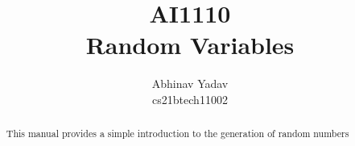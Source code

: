 \documentclass[journal,12pt,twocolumn]{IEEEtran}
\renewcommand\thesection{\arabic{section}}
\begin{document}
\let\StandardTheFigure\thefigure
\renewcommand{\thefigure}{\thesection}



\makeatletter
{}
\makeatother

\let\StandardTheFigure\thefigure
\let\StandardTheTable\thetable
\let\vec\mathbf
{}

\vspace{3cm}

\author{Abhinav Yadav \\ cs21btech11002}
\title{AI1110 \\ Random Variables}

\maketitle

\tableofcontents

\bigskip

\renewcommand{\thefigure}{\theenumi}
\renewcommand{\thetable}{\theenumi}

\begin{abstract}
    This manual provides a simple introduction to the generation of random numbers
\end{abstract}
\end{document}
